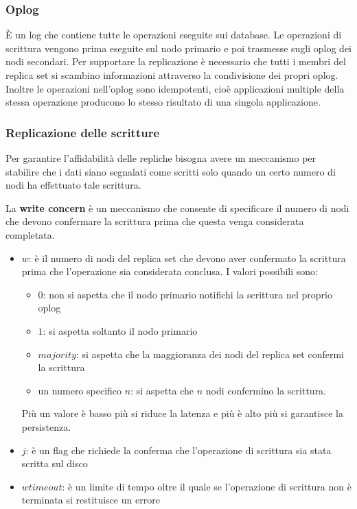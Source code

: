 \documentclass[a4paper,twoside]{article}
\begin{document}
\subsubsection{Oplog}
È un log che contiene tutte le operazioni eseguite sui database. Le operazioni di
scrittura vengono prima eseguite sul nodo primario e poi trasmesse sugli oplog
dei nodi secondari. Per supportare la replicazione è necessario che tutti i membri
del replica set si scambino informazioni attraverso la condivisione dei propri oplog.
Inoltre le operazioni nell'oplog sono idempotenti, cioè applicazioni multiple della
stessa operazione producono lo stesso risultato di una singola applicazione.

\subsubsection{Replicazione delle scritture}
Per garantire l'affidabilità delle repliche bisogna avere un meccanismo per stabilire
che i dati siano segnalati come scritti solo quando un certo numero di nodi 
ha effettuato tale scrittura.

\vspace{1em}
\noindent
La \textbf{write concern} è un meccanismo che consente di specificare il numero di nodi
che devono confermare la scrittura prima che questa venga considerata completata.
\begin{itemize}
  \item \( w \): è il numero di nodi del replica set che devono aver confermato
    la scrittura prima che l'operazione sia considerata conclusa. I valori possibili
    sono:
    \begin{itemize}
      \item \( 0 \): non si aspetta che il nodo primario notifichi la scrittura nel
        proprio oplog

      \item \( 1 \): si aspetta soltanto il nodo primario

      \item \( majority \): si aspetta che la maggioranza dei nodi del replica set
        confermi la scrittura

      \item un numero specifico \( n \): si aspetta che \( n \) nodi confermino la
        scrittura.
    \end{itemize}
   Più un valore è basso più si riduce la latenza e più è alto più si garantisce la
   persistenza.

 \item \( j \): è un flag che richiede la conferma che l'operazione di scrittura sia
   stata scritta sul disco

 \item \( wtimeout \): è un limite di tempo oltre il quale se l'operazione di scrittura
   non è terminata si restituisce un errore
\end{itemize}
\end{document}

